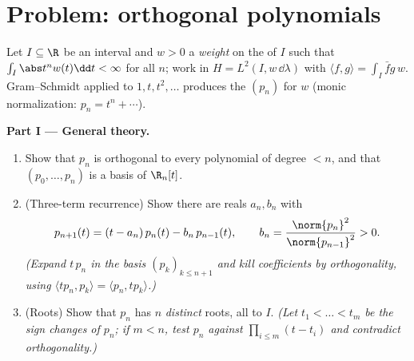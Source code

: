 \section{Problem: orthogonal polynomials}

\begin{problem}\label{pb:b3:hilbert:1}
Let $I \subseteq \R$ be an interval and $w > 0$ a 
\emph{weight} on the  of $I$ such that $\int_I
\abs t^nw(t)\dd t < \infty$ for all $n$; work in $H = L^2(I,
w\,\dd\lambda)$ with $\langle f, g\rangle = \int_I \bar
fg\,w$. Gram--Schmidt applied to $1, t, t^2, \dots$ produces
the \emph{} $(p_n)$ for $w$ (monic
normalization: $p_n = t^n + \cdots$).

\medskip
\noindent\textbf{Part I --- General theory.}
\begin{enumerate}
  \item Show that $p_n$ is orthogonal to every polynomial of
        degree $< n$, and that $(p_0, \dots, p_n)$ is a basis
        of $\R_n[t]$.
  \item (Three-term recurrence) Show there are reals $a_n,
        b_n$ with
        \[
        p_{n+1}(t) = (t - a_n)\,p_n(t) - b_n\,p_{n-1}(t),
        \qquad b_n = \frac{\norm{p_n}^2}{\norm{p_{n-1}}^2} >
        0 .
        \]
        \emph{(Expand $t\,p_n$ in the basis $(p_k)_{k \leq
        n+1}$ and kill coefficients by orthogonality, using
        $\langle tp_n, p_k\rangle = \langle p_n,
        tp_k\rangle$.)}
  \item (Roots) Show that $p_n$ has $n$ \emph{distinct} roots,
        all  to $I$. \emph{(Let $t_1 < \dots < t_m$ be
        the  sign changes of $p_n$; if $m < n$,
        test $p_n$ against $\prod_{i\leq m}(t - t_i)$ and
        contradict orthogonality.)}
\end{enumerate}


\end{problem}

